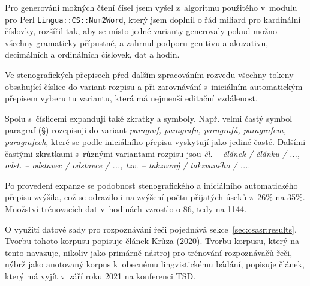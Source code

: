 Pro generování možných čtení čísel jsem vyšel z~algoritmu použitého v~modulu pro
Perl \texttt{Lingua::CS::Num2Word}, který jsem doplnil o řád miliard pro
kardinální číslovky, rozšířil tak, aby se místo jedné varianty generovaly
pokud možno všechny gramaticky přípustné, a zahrnul podporu genitivu a
akuzativu, decimálních a ordinálních číslovek, dat a hodin.

Ve stenografických přepisech před dalším zpracováním rozvedu všechny tokeny
obsahující číslice do variant rozpisu a při zarovnávání s~iniciálním
automatickým přepisem vyberu tu variantu, která má nejmenší editační vzdálenost.

Spolu s~číslicemi expanduji také zkratky a symboly. Např. velmi častý symbol
paragraf (§) rozepisuji do variant {\em paragraf, paragrafu, paragrafů,
paragrafem, paragrafech}, které se podle iniciálního přepisu vyskytují jako
jediné časté. Dalšími častými zkratkami s~různými variantami rozpisu jsou {\em
čl. -- článek / článku / ..., odst. -- odstavec / odstavce / ..., tzv. --
takzvaný / takzvaného / ...}.

Po provedení expanze se podobnost stenografického a iniciálního automatického
přepisu zvýšila, což se odrazilo i na zvýšení počtu přijatých úseků z~26\% na
35\%. Množství trénovacích dat v~hodinách vzrostlo o 86, tedy na 1144.

O využití datové sady pro rozpoznávání řeči pojednává sekce~\ref{sec:csasr:results}.
Tvorbu tohoto korpusu popisuje článek Krůza (2020)\cite{FedCSIS2020119}. Tvorbu
korpusu, který na tento navazuje, nikoliv jako primárně nástroj pro trénování
rozpoznávačů řeči, nýbrž jako anotovaný korpus k~obecnému lingvistickému bádání,
popisuje článek, který má vyjít v~září roku 2021 na konferenci TSD\cite{tsd2021parczech}.
